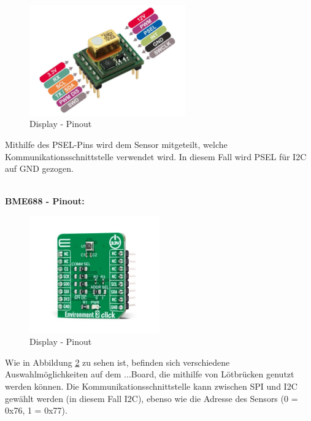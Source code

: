 \begin{inhalt}
\begin{figure}[!htb]
\centering
\includegraphics[width=0.6\textwidth]{files/Tobias/pics/Pinout/minieval_co2_pinout.pdf}
\caption[Display - Pinout]{Display - Pinout}
\label{fig:PASCO2_Pinout}
\end{figure}

Mithilfe des PSEL-Pins wird dem Sensor mitgeteilt, welche Kommunikationsschnittstelle verwendet wird. In diesem Fall wird PSEL für I2C auf GND gezogen.

\bigskip \\

\textbf{BME688 - Pinout:}

\begin{figure}[!htb]
\centering
\includegraphics[width=0.5\textwidth]{files/Tobias/pics/Pinout/environment-3-click-thickbox_default-2.jpg}
\caption[Display - Pinout]{Display - Pinout}
\label{fig:BME688_Pinout}
\end{figure}

Wie in Abbildung \ref{fig:BME688_Pinout} zu sehen ist, befinden sich verschiedene Auswahlmöglichkeiten auf dem ...Board, die mithilfe von Lötbrücken genutzt werden können. Die Kommunikationsschnittstelle kann zwischen SPI und I2C gewählt werden (in diesem Fall I2C), ebenso wie die Adresse des Sensors (0 = 0x76, 1 = 0x77). 






\end{inhalt}
